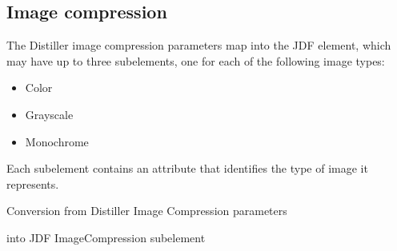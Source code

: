 \documentclass[letterpaper,12pt,english,openany,oneside]{sphinxmanual}
\begin{document}
\subsection{Image compression}
\label{\detokenize{PDF_Create_JDF:image-compression}}
The Distiller image compression parameters map into the JDF  element, which may have up to three  subelements, one for each of the following image types:
\begin{itemize}
\item {} 
Color

\item {} 
Grayscale

\item {} 
Monochrome

\end{itemize}

Each  subelement contains an  attribute that identifies the type of image it represents.

\begin{DUlineblock}{0em}
\item[] Conversion from Distiller Image Compression parameters
\item[] into JDF ImageCompression subelement
\end{DUlineblock}
\end{document}
